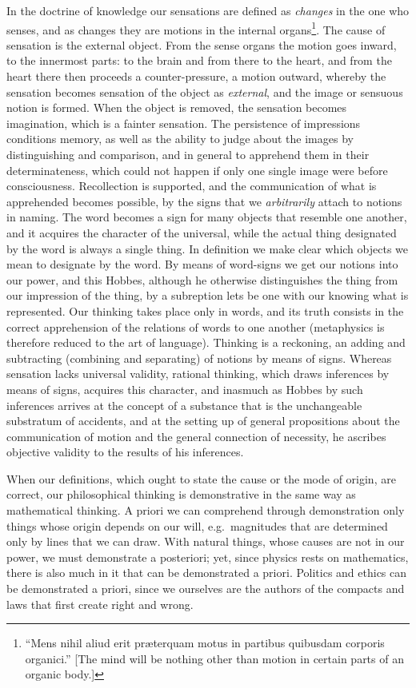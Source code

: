 In the doctrine of knowledge our sensations are defined as \emph{changes} in the one who senses, and as changes they are motions in the internal organs\footnote{``Mens nihil aliud erit præterquam motus in partibus quibusdam corporis organici.'' [The mind will be nothing other than motion in certain parts of an organic body.]}. The cause of sensation is the external object. From the sense organs the motion goes inward, to the innermost parts: to the brain and from there to the heart, and from the heart there then proceeds a counter-pressure, a motion outward, whereby the sensation becomes sensation of the object as \emph{external}, and the image or sensuous notion is formed. When the object is removed, the sensation becomes imagination, which is a fainter sensation. The persistence of impressions conditions memory, as well as the ability to judge about the images by distinguishing and comparison, and in general to apprehend them in their determinateness, which could not happen if only one single image were before consciousness. Recollection is supported, and the communication of what is apprehended becomes possible, by the signs that we \emph{arbitrarily} attach to notions in naming. The word becomes a sign for many objects that resemble one another, and it acquires the character of the universal, while the actual thing designated by the word is always a single thing. In definition we make clear which objects we mean to designate by the word. By means of word-signs we get our notions into our power, and this Hobbes, although he otherwise distinguishes the thing from our impression of the thing, by a subreption lets be one with our knowing what is represented. Our thinking takes place only in words, and its truth consists in the correct apprehension of the relations of words to one another (metaphysics is therefore reduced to the art of language). Thinking is a reckoning, an adding and subtracting (combining and separating) of notions by means of signs. Whereas sensation lacks universal validity, rational thinking, which draws inferences by means of signs, acquires this character, and inasmuch as Hobbes by such inferences arrives at the concept of a substance that is the unchangeable substratum of accidents, and at the setting up of general propositions about the communication of motion and the general connection of necessity, he ascribes objective validity to the results of his inferences.

When our definitions, which ought to state the cause or the mode of origin, are correct, our philosophical thinking is demonstrative in the same way as mathematical thinking. A priori we can comprehend through demonstration only things whose origin depends on our will, e.g.\ magnitudes that are determined only by lines that we can draw. With natural things, whose causes are not in our power, we must demonstrate a posteriori; yet, since physics rests on mathematics, there is also much in it that can be demonstrated a priori.
Politics and ethics can be demonstrated a priori, since we ourselves are the authors of the compacts and laws that first create right and wrong.

